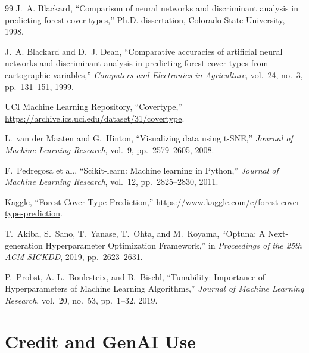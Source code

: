 \documentclass{article}
\begin{document}
{\footnotesize
\begin{thebibliography}{99}
  J.~A. Blackard, ``Comparison of neural networks and discriminant analysis in predicting forest cover types,'' Ph.D. dissertation, Colorado State University, 1998.

  J.~A. Blackard and D.~J. Dean, ``Comparative accuracies of artificial neural networks and discriminant analysis in predicting forest cover types from cartographic variables,'' \textit{Computers and Electronics in Agriculture}, vol.~24, no.~3, pp.~131--151, 1999.

  UCI Machine Learning Repository, ``Covertype,'' \url{https://archive.ics.uci.edu/dataset/31/covertype}.

  L.~van der Maaten and G.~Hinton, ``Visualizing data using t-SNE,'' \textit{Journal of Machine Learning Research}, vol.~9, pp.~2579--2605, 2008.

  F.~Pedregosa et al., ``Scikit-learn: Machine learning in Python,'' \textit{Journal of Machine Learning Research}, vol.~12, pp.~2825--2830, 2011.

  Kaggle, ``Forest Cover Type Prediction,'' \url{https://www.kaggle.com/c/forest-cover-type-prediction}.

  T.~Akiba, S.~Sano, T.~Yanase, T.~Ohta, and M.~Koyama, ``Optuna: A Next-generation Hyperparameter Optimization Framework,'' in \textit{Proceedings of the 25th ACM SIGKDD}, 2019, pp.~2623--2631.

  P.~Probst, A.-L.~Boulesteix, and B.~Bischl, ``Tunability: Importance of Hyperparameters of Machine Learning Algorithms,'' \textit{Journal of Machine Learning Research}, vol.~20, no.~53, pp.~1--32, 2019.
\end{thebibliography}
}

\section*{Credit and GenAI Use}
\end{document}
